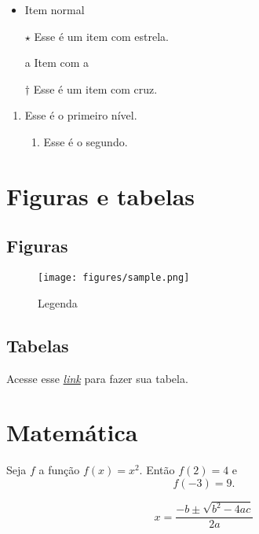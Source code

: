 \begin{itemize}
    \item Item normal
    \item [$\star$] Esse é um item com estrela.
    \item [a] Item com a
    \item [$\dagger$] Esse é um item com cruz.
\end{itemize}

\vspace{1cm}

\begin{enumerate}
    \item Esse é o primeiro nível.
    \begin{enumerate}
        \item Esse é o segundo.
    \end{enumerate}
\end{enumerate}

\section{Figuras e tabelas}
\label{sec: fig/tab}

\subsection{Figuras}

\begin{figure}[H]
    \centering
    \texttt{[image: figures/sample.png]}
    \caption{Legenda}
    \label{fig: sample}
\end{figure}

\subsection{Tabelas}

Acesse esse \href{https://www.tablesgenerator.com}{\textit{link}} para fazer sua tabela.

\section{Matemática}

Seja $f$ a função $f(x)=x^2$.
Então $f(2)=4$ e \[ f(-3)=9. \]

\begin{equation}
    x = \frac{-b \pm \sqrt{b^2 - 4ac}}{2a}
\label{eq: bhaskara}
\end{equation}

